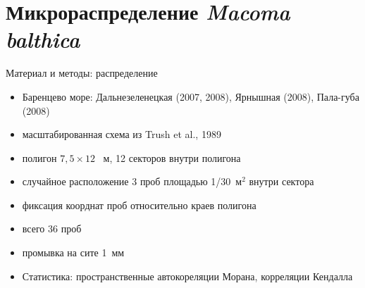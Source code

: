 \documentclass{beamer}
\begin{document}
		\section[Мик\-ро\-рас\-пре\-де\-ле\-ние]{Микрораспределение {\it Macoma balthica}}
\begin{frame}{Материал и методы: распределение}
\begin{itemize}
	\item Баренцево море: Дальнезеленецкая (2007, 2008), Ярнышная (2008), Пала-губа (2008)
	\item масштабированная схема из Trush et al., 1989
	\item полигон $7,5 \times 12$~ м, 12 секторов внутри полигона
	\item случайное расположение 3 проб площадью 1/30~м$^2$ внутри сектора
	\item фиксация коорднат проб относительно краев полигона
	\item всего 36 проб 
	\item промывка на сите 1~мм
	\item Статистика: пространственные автокореляции Морана, корреляции Кендалла
\end{itemize}
\end{frame}
\end{document}
